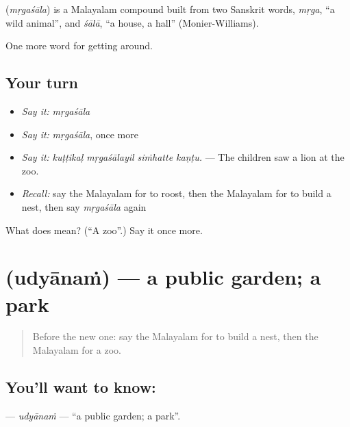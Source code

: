 \begin{cousinweb}
\textbf{} (\emph{mṛgaśāla}) is a Malayalam compound built from two Sanskrit words, \emph{mṛga}, \textquotedblleft{}a wild animal\textquotedblright{}, and \emph{śālā}, \textquotedblleft{}a house, a hall\textquotedblright{} (Monier-Williams).
\end{cousinweb}

\begin{grammarlens}[title={What you've built}]
One more word for getting around.
\end{grammarlens}

\subsection*{Your turn}
\begin{itemize}
\raggedright
  \item \emph{Say it:} \emph{mṛgaśāla}
  \item \emph{Say it:} \emph{mṛgaśāla}, once more
  \item \emph{Say it:} \emph{kuṭṭikaḷ mṛgaśālayil siṁhatte kaṇṭu.} — The children saw a lion at the zoo.
  \item \emph{Recall:} say the Malayalam for to roost, then the Malayalam for to build a nest, then say \emph{mṛgaśāla} again
\end{itemize}

\begin{tcolorbox}[breakable,colback=teal!4,colframe=teal!35!black,title={Before you move on}]
What does  mean? (\textquotedblleft{}A zoo\textquotedblright{}.) Say it once more.
\end{tcolorbox}
\section[\texorpdfstring{\ml{ഉദ്യാനം} (udyānaṁ)}{ഉദ്യാനം (udyānaṁ)}]{ (udyānaṁ) — a public garden; a park}

\label{lesson:ML-C501-udyanam}



\begin{quote}
Before the new one: say the Malayalam for to build a nest, then the Malayalam for a zoo.
\end{quote}

\subsection*{You'll want to know: }
\textbf{} — \emph{udyānaṁ} — \textquotedblleft{}a public garden; a park\textquotedblright{}.

